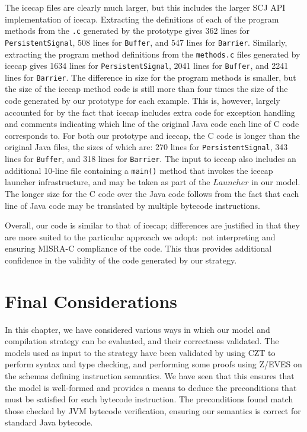 {The icecap files are clearly much larger, but this includes the larger
SCJ API implementation of icecap.
Extracting the definitions of each of the program methods from the
\texttt{.c} generated by the prototype gives 362 lines for
\texttt{PersistentSignal}, 508 lines for \texttt{Buffer}, and 547
lines for \texttt{Barrier}.
Similarly, extracting the program method definitions from the
\texttt{methods.c} files generated by icecap gives 1634 lines for
\texttt{PersistentSignal}, 2041 lines for \texttt{Buffer}, and 2241
lines for \texttt{Barrier}.
The difference in size for the program methods is smaller, but the
size of the icecap method code is still more than four times the size
of the code generated by our prototype for each example.
This is, however, largely accounted for by the fact that icecap
includes extra code for exception handling and comments indicating
which line of the original Java code each line of C code corresponds
to.
For both our prototype and icecap, the C code is longer than the
original Java files, the sizes of which are: 270 lines for
\texttt{PersistentSignal}, 343 lines for \texttt{Buffer}, and 318
lines for \texttt{Barrier}.
The input to icecap also includes an additional 10-line file
containing a \texttt{main()} method that invokes the icecap launcher
infrastructure, and may be taken as part of the $Launcher$ in our
model.
The longer size for the C code over the Java code follows from the
fact that each line of Java code may be translated by multiple
bytecode instructions.

Overall, our code is similar to that of icecap; differences are
justified in that they are more suited to the particular approach we
adopt:~not interpreting and ensuring MISRA-C compliance of the code.
This thus provides additional confidence in the validity of the code
generated by our strategy.
}

\section{Final Considerations}
\label{evaluation-final-considerations-section}

In this chapter, we have considered various ways in which our model
and compilation strategy can be evaluated, and their correctness
validated.
The models used as input to the strategy have been validated by using
CZT to perform syntax and type checking, and performing some proofs
using Z/EVES on the schemas defining instruction semantics.
We have seen that this ensures that the model is well-formed and
provides a means to deduce the preconditions that must be satisfied
for each bytecode instruction.
The preconditions found match those checked by JVM bytecode
verification, ensuring our semantics is correct for standard Java
bytecode.


